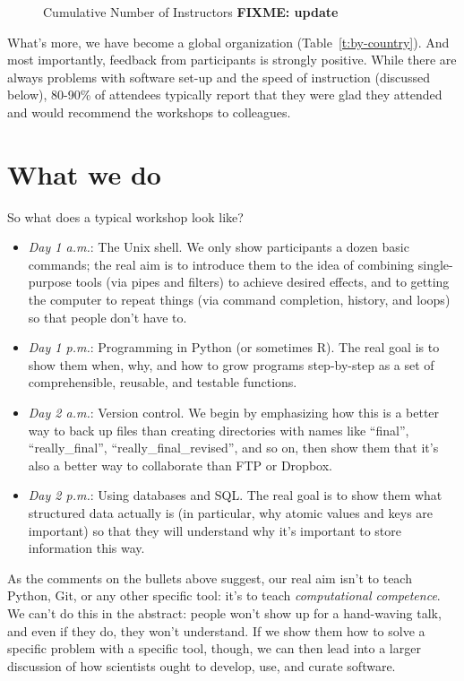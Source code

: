 \documentclass[10pt,a4paper,twocolumn]{article}
\newcommand{\fixme}[1]{\bf{FIXME: {#1}}}
\begin{document}
\begin{figure}
\centering
\caption{Cumulative Number of Instructors \fixme{update}}
\label{f:instructors}
\end{figure}

What's more, we have become a global organization
(Table~\ref{t:by-country}).  And most importantly, feedback from
participants is strongly positive.  While there are always problems
with software set-up and the speed of instruction (discussed below),
80-90\% of attendees typically report that they were glad they
attended and would recommend the workshops to colleagues.

\section*{What we do}

So what does a typical workshop look like?

\begin{itemize}
\item
  \emph{Day 1 a.m.}: The Unix shell. We only show participants a dozen
  basic commands; the real aim is to introduce them to the idea of
  combining single-purpose tools (via pipes and filters) to achieve
  desired effects, and to getting the computer to repeat things (via
  command completion, history, and loops) so that people don't have
  to.
\item
  \emph{Day 1 p.m.}: Programming in Python (or sometimes R). The real
  goal is to show them when, why, and how to grow programs
  step-by-step as a set of comprehensible, reusable, and testable
  functions.
\item
  \emph{Day 2 a.m.}: Version control. We begin by emphasizing how this
  is a better way to back up files than creating directories with names
  like ``final'', ``really\_final'', ``really\_final\_revised'', and
  so on, then show them that it's also a better way to collaborate
  than FTP or Dropbox.
\item
  \emph{Day 2 p.m.}: Using databases and SQL.  The real goal is to
  show them what structured data actually is (in particular, why
  atomic values and keys are important) so that they will understand
  why it's important to store information this way.
\end{itemize}

As the comments on the bullets above suggest, our real aim isn't to
teach Python, Git, or any other specific tool: it's to teach
\emph{computational competence}. We can't do this in the abstract:
people won't show up for a hand-waving talk, and even if they do, they
won't understand. If we show them how to solve a specific problem with
a specific tool, though, we can then lead into a larger discussion of
how scientists ought to develop, use, and curate software.
\end{document}
